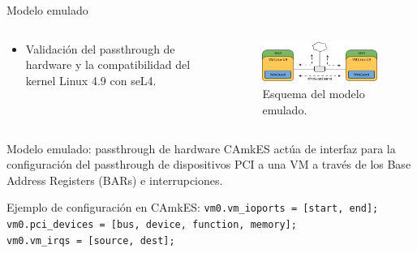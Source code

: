 \documentclass[serif, aspectratio=169]{beamer}
\begin{document}
\begin{frame}{Modelo emulado}
    \begin{columns}
        \begin{column}{0.4\textwidth}
            \begin{itemize}
                \item Validación del passthrough de hardware y la compatibilidad del kernel Linux 4.9 con seL4.
            \end{itemize}
        \end{column}
        \begin{column}{0.6\textwidth}
            \begin{figure}
                \centering
                \includegraphics[width=0.95\textwidth]{../../Tesis/figs/3_modelemulated.png}
                \caption{Esquema del modelo emulado.}
            \end{figure}
        \end{column}
    \end{columns}

\end{frame}

\begin{frame}{Modelo emulado: passthrough de hardware}
    CAmkES actúa de interfaz para la configuración del passthrough de dispositivos PCI a una VM a través de los Base Address Registers (BARs) e interrupciones.
    
    \vspace*{1cm}

     \begin{block}{\small Ejemplo de configuración en CAmkES:}
          \texttt{vm0.vm\_ioports = [start, end];} \\
          \texttt{vm0.pci\_devices = [bus, device, function, memory];} \\
          \texttt{vm0.vm\_irqs = [source, dest];}
     \end{block}
\end{frame}
\end{document}
